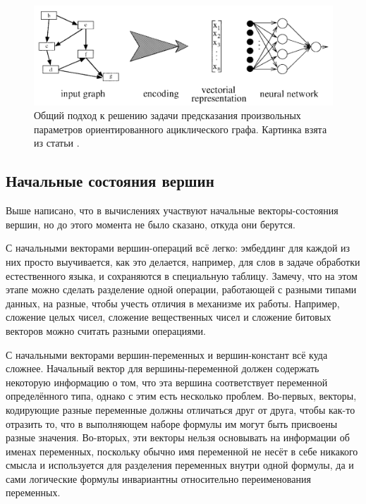 \begin{figure}[ht]
\begin{center}
    \includegraphics[scale=0.25]{./assets/rvnn-process.png}
    \caption{\label{rvnn-process} Общий подход к решению задачи предсказания произвольных параметров ориентированного ациклического графа. Картинка взята из статьи \cite{rvnn-intro-paper}.}
\end{center}
\end{figure}

\subsection{Начальные состояния вершин} \label{vertex-initial-states}

Выше написано, что в вычислениях участвуют начальные векторы-состояния вершин, но до этого момента не было сказано, откуда они берутся.

С начальными векторами вершин-операций всё легко: эмбеддинг для каждой из них просто выучивается, как это делается, например, для слов в задаче обработки естественного языка, и сохраняются в специальную таблицу. Замечу, что на этом этапе можно сделать разделение одной операции, работающей с разными типами данных, на разные, чтобы учесть отличия в механизме их работы. Например, сложение целых чисел, сложение вещественных чисел и сложение битовых векторов можно считать разными операциями.

С начальными векторами вершин-переменных и вершин-констант всё куда сложнее. Начальный вектор для вершины-переменной должен содержать некоторую информацию о том, что эта вершина соответствует переменной определённого типа, однако с этим есть несколько проблем. Во-первых, векторы, кодирующие разные переменные должны отличаться друг от друга, чтобы как-то отразить то, что в выполняющем наборе формулы им могут быть присвоены разные значения. Во-вторых, эти векторы нельзя основывать на информации об именах переменных, поскольку обычно имя переменной не несёт в себе никакого смысла и используется для разделения переменных внутри одной формулы, да и сами логические формулы инвариантны относительно переименования переменных.

